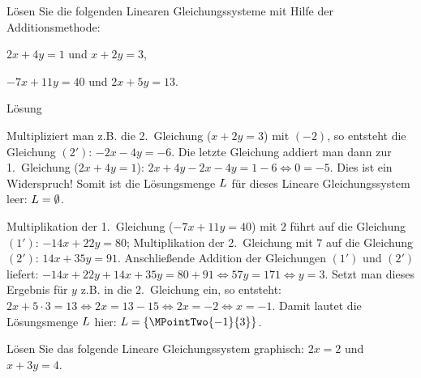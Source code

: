 \begin{MExercises}
\begin{MExercise}
Lösen Sie die folgenden Linearen Gleichungssysteme mit Hilfe der Additionsmethode:
\begin{MExerciseItems}
\item{$2 x + 4 y = 1$ und $x + 2 y = 3$,}
\item{$- 7 x + 11 y = 40$ und $2 x + 5 y = 13$.}
\end{MExerciseItems}

\begin{MHint}{Lösung}
\begin{MExerciseItems}
\item{Multipliziert man z.B. die 2.~Gleichung ($x + 2 y = 3$) mit $(- 2)$, so entsteht die Gleichung $(2')$:
$- 2 x - 4 y = - 6$. Die letzte Gleichung addiert man dann zur 1.~Gleichung ($2 x + 4 y = 1$):
$2 x + 4 y - 2 x - 4 y = 1 - 6 \Leftrightarrow 0 = - 5$. Dies ist ein Widerspruch! Somit ist die Lösungsmenge
$L$ für dieses Lineare Gleichungssystem leer: ${L} = \emptyset$.}
\item{Multiplikation der 1.~Gleichung ($- 7 x + 11 y = 40$) mit $2$ führt auf die Gleichung $(1')$:
$- 14 x + 22 y = 80$; Multiplikation der 2.~Gleichung mit $7$ auf die Gleichung $(2')$:
$14 x + 35 y = 91$. Anschließende Addition der Gleichungen $(1')$ und $(2')$ liefert:
$- 14 x + 22 y + 14 x + 35 y = 80 + 91 \Leftrightarrow 57 y = 171 \Leftrightarrow y = 3$. Setzt man dieses
Ergebnis für $y$ z.B. in die 2.~Gleichung ein, so entsteht: $2 x + 5 \cdot 3 = 13 \Leftrightarrow
2 x = 13 - 15 \Leftrightarrow 2 x = - 2 \Leftrightarrow x = - 1$. Damit lautet die Lösungsmenge $L$ hier:
${\ML} = \{ \MPointTwo{- 1}{ 3} \}$.}
\end{MExerciseItems}
\end{MHint}
\end{MExercise}

\begin{MExercise}
Lösen Sie das folgende Lineare Gleichungssystem graphisch: $2 x = 2$ und $x + 3 y = 4$.


\end{MExercise}
\end{MExercises}
